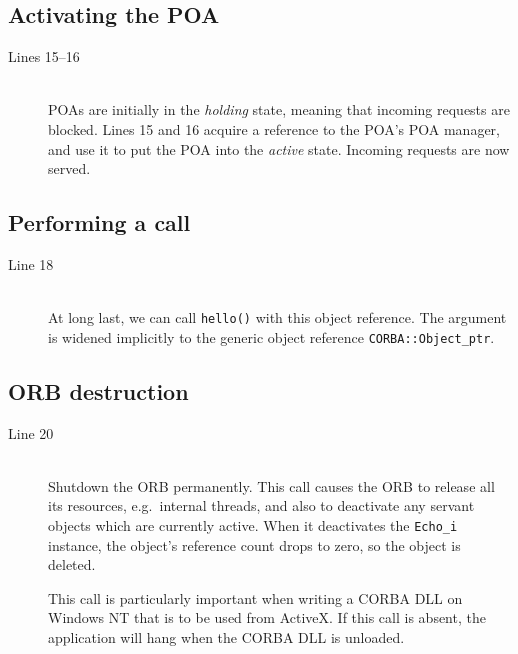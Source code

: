 \documentclass[11pt,twoside,a4paper]{book}
\newcommand{\type}[1]{\texttt{#1}}
\newcommand{\op}[1]{\texttt{#1()}}
\newcommand{\term}[1]{\textit{#1}}
\begin{document}
\subsection{Activating the POA}

\begin{description}

\item[Lines 15--16]\mbox{}\\
%
POAs are initially in the \term{holding} state, meaning that incoming
requests are blocked. Lines 15 and 16 acquire a reference to the POA's
POA manager, and use it to put the POA into the \term{active} state.
Incoming requests are now served.

\end{description}


\subsection{Performing a call}

\begin{description}

\item[Line 18]\mbox{}\\
%
At long last, we can call \op{hello} with this object reference. The
argument is widened implicitly to the generic object reference
\type{CORBA::Object\_ptr}.

\end{description}


\subsection{ORB destruction}

\begin{description}

\item[Line 20]\mbox{}\\
%
Shutdown the ORB permanently. This call causes the ORB to release all
its resources, e.g.\ internal threads, and also to deactivate any
servant objects which are currently active. When it deactivates the
\type{Echo\_i} instance, the object's reference count drops to zero,
so the object is deleted.

This call is particularly important when writing a CORBA DLL on
Windows NT that is to be used from ActiveX. If this call is absent,
the application will hang when the CORBA DLL is unloaded.

\end{description}
\end{document}
